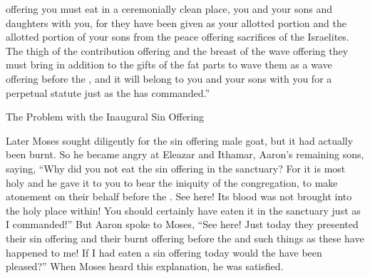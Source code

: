 {offering you must eat
in a ceremonially clean
place,
you
and your sons
and daughters
with
you, for
they have been given as your allotted portion
and the allotted portion
of your sons
from the peace offering
sacrifices
of the Israelites.
The thigh
of the contribution
offering and the breast
of the wave offering
they must bring
in addition
to the gifts
of the fat
parts to wave
them as a wave offering
before
the {}, and it will belong
to you and your sons
with
you for a perpetual
statute
just
as the
{}
has commanded.”
\par }{\SH The Problem with the Inaugural Sin Offering
\par }{\PP {}Later Moses
sought diligently
for the sin offering
male goat,
but it had actually
been burnt. So he became angry
at Eleazar
and Ithamar,
Aaron’s
remaining
sons,
saying,
“Why
did you not
eat
the
sin offering
in the sanctuary? For
it is most
holy
and he gave
it to you to bear
the
iniquity
of the congregation,
to make atonement
on
their behalf before
the {}.
See here! Its blood
was not
brought
into
the holy place
within! You should certainly have eaten
it in the sanctuary
just as I commanded!”
But
Aaron
spoke to
Moses,
“See here! Just today
they presented
their sin offering
and their burnt offering
before
the {}
and such
things as these
have happened to me! If I had eaten
a sin offering
today
would the
{}
have been pleased?”
When Moses
heard
this explanation,
he was satisfied.

}
